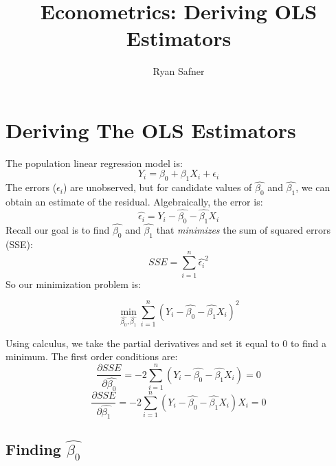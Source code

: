 \documentclass{article}
\title{Econometrics: Deriving OLS Estimators}
\author{Ryan Safner}
\date{}
\begin{document}
	\maketitle
	
\section{Deriving The OLS Estimators}
The population linear regression model is: 
\begin{equation*}
Y_i=\beta_0+\beta_1 X_i + \epsilon _i
\end{equation*}
The errors ($\epsilon_i$) are unobserved, but for candidate values of $\hat{\beta_0}$ and $\hat{\beta_1}$, we can obtain an estimate of the residual. Algebraically, the error is: 
\begin{equation}
\hat{\epsilon_i}=    Y_i-\hat{\beta_0}-\hat{\beta_1}X_i
\end{equation}
 Recall our goal is to find $\hat{\beta_0}$ and $\hat{\beta_1}$ that \emph{minimizes} the sum of squared errors (SSE): 
 \begin{equation}
     SSE= \sum^n_{i=1} \hat{\epsilon_i}^2 
 \end{equation}
So our minimization problem is:

\begin{equation}
\min_{\hat{\beta_0}, \hat{\beta_1}} \sum^n_{i=1} (Y_i-\hat{\beta_0}-\hat{\beta_1}X_i)^2	
\end{equation}

Using calculus, we take the partial derivatives and set it equal to 0 to find a minimum. The first order conditions are: 
\begin{equation}
\frac{\partial SSE}{\partial \hat{\beta_0}}=-2\displaystyle\sum^n_{i=1} (Y_i-\hat{\beta_0}-\hat{\beta_1} X_i)=0 	
\label{eq:FOC1}
\end{equation}
\begin{equation}
\frac{\partial SSE}{\partial \hat{\beta_1}}=-2\displaystyle\sum^n_{i=1} (Y_i-\hat{\beta_0}-\hat{\beta_1} X_i)X_i=0 	
\label{eq:FOC2}
\end{equation}

\subsection{Finding $\hat{\beta_0}$}
\end{document}
